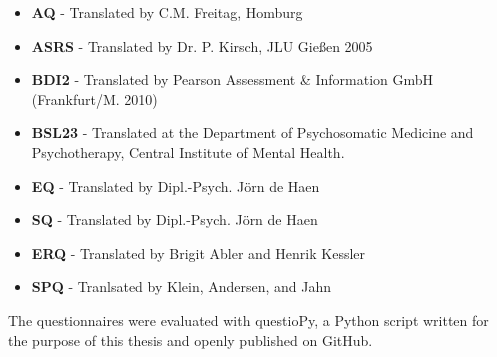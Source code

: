 	\begin{itemize}
	    \item \textbf{AQ} - Translated by C.M. Freitag, Homburg
	    \item \textbf{ASRS} - Translated by Dr. P. Kirsch, JLU Gießen 2005
	    \item \textbf{BDI2} - Translated by Pearson Assessment \& Information GmbH (Frankfurt/M. 2010)
	    \item \textbf{BSL23} - Translated at the Department of Psychosomatic Medicine and Psychotherapy, Central Institute of Mental Health.
	    \item \textbf{EQ} - Translated by Dipl.-Psych. Jörn de Haen
	    \item \textbf{SQ} - Translated by Dipl.-Psych. Jörn de Haen
	    \item \textbf{ERQ} - Translated by Brigit Abler and Henrik Kessler \citep{Abler2009}
	    \item \textbf{SPQ} - Tranlsated by Klein, Andersen, and Jahn \citep{Klein1997}
	\end{itemize}
	The questionnaires were evaluated with questioPy\citep{questiopy}, a Python script written for the purpose of this thesis and openly published on GitHub\citep{github}.
